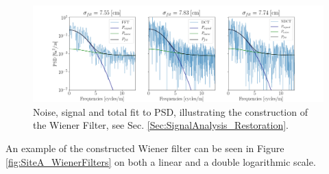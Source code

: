 \documentclass[../../CompleteThesis2/Complete_2ndDraft]{subfiles}
\begin{document}
\begin{figure}
	\centering
	\includegraphics[width=\textwidth]{SpectralTransforms_PSDwFits.png}
	\caption[FFT, DCT, NDCT PSDs with Fit, Site A]{\small Noise, signal and total fit to PSD, illustrating the construction of the Wiener Filter, see Sec. \ref{Sec:SignalAnalysis_Restoration}.}
	\label{fig:SpectralTransforms_PSDwFits}
\end{figure}

An example of the constructed Wiener filter can be seen in Figure \ref{fig:SiteA_WienerFilters} on both a linear and a double logarithmic scale.
\end{document}
